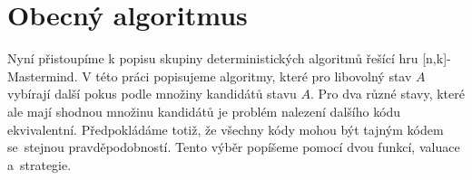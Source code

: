 






\section{Obecný algoritmus}
Nyní přistoupíme k popisu skupiny deterministických algoritmů řešící hru [n,k]-Mastermind. V této práci popisujeme algoritmy, které pro libovolný stav $A$ vybírají další pokus podle množiny kandidátů stavu $A$. 
Pro dva různé stavy, které ale mají shodnou množinu kandidátů je problém nalezení dalšího kódu ekvivalentní. Předpokládáme totiž, že všechny kódy mohou být tajným kódem se~stejnou pravděpodobností. 
Tento výběr popíšeme pomocí dvou funkcí, valuace a~strategie. 




